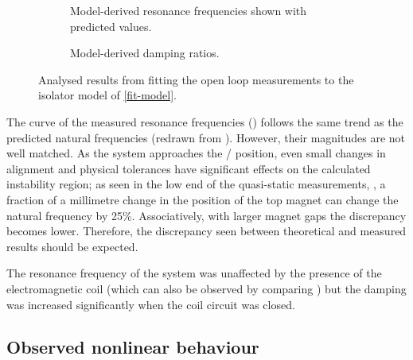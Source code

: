 \documentclass[11pt,a4paper]{memoir}
\begin{document}
\begin{figure}[p]
\end{figure}

\begin{figure}
  \begin{wide}
  \begin{subfigure}
    \caption{Model-derived resonance frequencies shown with predicted values.}
  \end{subfigure}
  \hfil
  \begin{subfigure}
    \caption{Model-derived damping ratios.}
  \end{subfigure}
  \end{wide}
  \caption{Analysed results from fitting the open loop measurements to the isolator model of \eqref{fit-model}.}
\end{figure}

The curve of the measured resonance frequencies () follows the same trend as the predicted natural frequencies (redrawn from ).
However, their magnitudes are not well matched.
As the system approaches the \qzs/ position, even small changes in alignment and physical tolerances have significant effects on the calculated instability region; as seen in the low end of the quasi-static measurements, , a fraction of a millimetre change in the position of the top magnet can change the natural frequency by 25\%.
Associatively, with larger magnet gaps the discrepancy becomes lower.
Therefore, the discrepancy seen between theoretical and measured results should be expected.

The resonance frequency of the system was unaffected by the presence of the electromagnetic coil (which can also be observed by comparing ) but the damping was increased significantly when the coil circuit was closed.


\subsection{Observed nonlinear behaviour}
\end{document}
